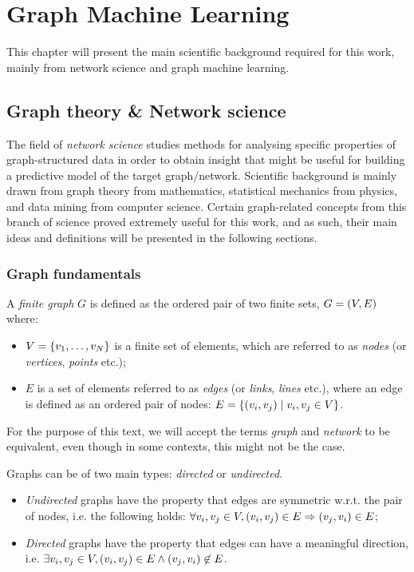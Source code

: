 \chapter{Graph Machine Learning}
\label{chp: background}


This chapter will present the main scientific background required for this work, mainly from network science and graph machine learning.

\section{Graph theory \& Network science}
The field of \emph{network science} studies methods for analysing specific properties of graph-structured data in order to obtain insight that might be useful for building a predictive model of the target graph/network. Scientific background is mainly drawn from graph theory from mathematics, statistical mechanics from physics, and data mining from computer science. Certain graph-related concepts from this branch of science proved extremely useful for this work, and as such, their main ideas and definitions will be presented in the following sections.

\subsection{Graph fundamentals}
\begin{definition}
A \emph{finite graph} $G$ is defined as the ordered pair of two finite sets, $G=\mathopen{}\left(V,E\right)$ where:
\begin{itemize}
\item $V=\mathopen{}\left\{v_1, \dots, v_N\right\}$ is a finite set of elements, which are referred to as \emph{nodes} (or \emph{vertices}, \emph{points} etc.);
\item $E$ is a set of elements referred to as \emph{edges} (or \emph{links}, \emph{lines} etc.), where an edge is defined as an ordered pair of nodes: $E=\mathopen{}\left\{\mathopen{}\left(v_i,v_j\right)\mid v_i,v_j \in V\right\}$.
\end{itemize}
\end{definition}
For the purpose of this text, we will accept the terms \emph{graph} and \emph{network} to be equivalent, even though in some contexts, this might not be the case.

\begin{definition}
Graphs can be of two main types: \emph{directed} or \emph{undirected}.
\begin{itemize}
\item \emph{Undirected} graphs have the property that edges are symmetric w.r.t. the pair of nodes, i.e. the following holds: $\forall v_i,v_j \in V, \mathopen{}\left(v_i,v_j\right) \in E \Rightarrow \mathopen{}\left(v_j, v_i\right) \in E$;
\item \emph{Directed} graphs have the property that edges can have a meaningful direction, i.e. $\exists v_i,v_j \in V, \mathopen{}\left(v_i,v_j\right) \in E \wedge \mathopen{}\left(v_j, v_i\right) \not\in E$.
\end{itemize}
\end{definition}


